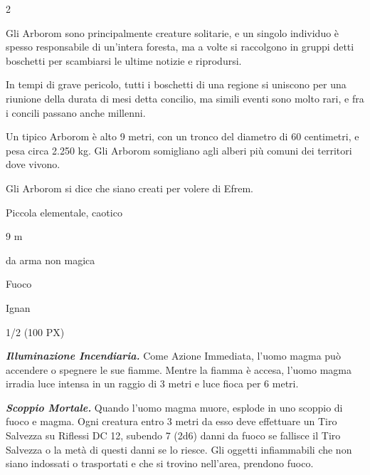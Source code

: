 \begin{multicols}{2}
{Gli Arborom sono principalmente creature solitarie, e un singolo individuo è spesso responsabile di un'intera foresta, ma a volte si raccolgono in gruppi detti boschetti per scambiarsi le ultime notizie e riprodursi.

In tempi di grave pericolo, tutti i boschetti di una regione si uniscono per una riunione della durata di mesi detta concilio, ma simili eventi sono molto rari, e fra i concili passano anche millenni.

Un tipico Arborom è alto 9 metri, con un tronco del diametro di 60 centimetri, e pesa circa 2.250 kg. Gli Arborom somigliano agli alberi più comuni dei territori dove vivono.

Gli Arborom si dice che siano creati per volere di Efrem.

\begin{description}[noitemsep, topsep=0pt, parsep=0pt, partopsep=0pt, itemsep=1pt, leftmargin=2.35cm,  labelwidth=2.2cm, itemindent=0cm, listparindent=0pt] %
\setlength{\baselineskip}{10pt}
\item[\textbf{Taglia/Tipo}] Piccola elementale, caotico
\item[\textbf{Caratt.}] 
\item[\textbf{Punti Ferita}] 
\item[\textbf{Movimento}] 9 m
\item[\textbf{Tiri Salvez.}] 
\item[\textbf{Res. Danni}] da arma non magica\\
\item[\textbf{Imm. Danni}] Fuoco
\item[\textbf{Sensi}] 
\item[\textbf{Linguaggi}] Ignan
\item[\textbf{Sfida}] 1/2 (100 PX)
\end{description}
\smallskip

\emph{\textbf{Illuminazione Incendiaria.}} Come Azione Immediata, l'uomo magma può accendere o spegnere le sue fiamme. Mentre la fiamma è accesa, l'uomo magma irradia luce intensa in un raggio di 3 metri e luce fioca per 6 metri.

\emph{\textbf{Scoppio Mortale.}} Quando l'uomo magma muore, esplode in uno scoppio di fuoco e magma. Ogni creatura entro 3 metri da esso deve effettuare un Tiro Salvezza su Riflessi DC 12, subendo 7 (2d6) danni da fuoco se fallisce il Tiro Salvezza o la metà di questi danni se lo riesce. Gli oggetti infiammabili che non siano indossati o trasportati e che si trovino nell'area, prendono fuoco.

}
\end{multicols}
